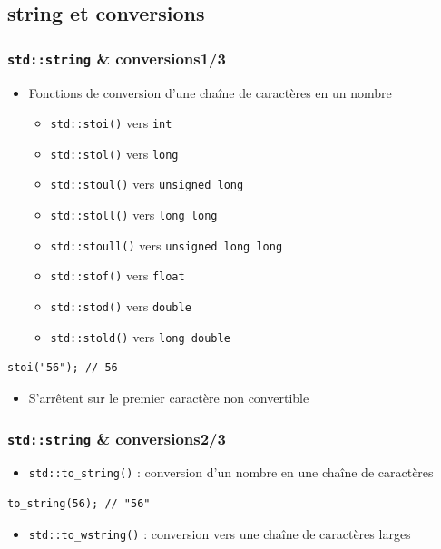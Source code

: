 \documentclass[C++.tex]{subfiles}
\begin{document}
\subsection*{string et conversions}
\begin{frame}[fragile]
	\frametitle{\lstinline|std::string| \& conversions\titlehfill{}1/3}
	\begin{itemize}
		\item Fonctions de conversion d'une chaîne de caractères en un nombre
		\begin{itemize}
			\item \lstinline|std::stoi()| vers \lstinline|int|
			\item \lstinline|std::stol()| vers \lstinline|long|
			\item \lstinline|std::stoul()| vers \lstinline|unsigned long|
			\item \lstinline|std::stoll()| vers \lstinline|long long|
			\item \lstinline|std::stoull()| vers \lstinline|unsigned long long|
			\item \lstinline|std::stof()| vers \lstinline|float|
			\item \lstinline|std::stod()| vers \lstinline|double|
			\item \lstinline|std::stold()| vers \lstinline|long double|
		\end{itemize}
	\end{itemize}

	\begin{lstlisting}
stoi("56"); // 56\end{lstlisting}

	\begin{itemize}
		\item S'arrêtent sur le premier caractère non convertible
	\end{itemize}
\end{frame}

\begin{frame}[fragile]
	\frametitle{\lstinline|std::string| \& conversions\titlehfill{}2/3}
	\begin{itemize}
		\item \lstinline|std::to_string()| : conversion d'un nombre en une chaîne de caractères
	\end{itemize}

	\begin{lstlisting}
to_string(56); // "56"\end{lstlisting}

	\begin{itemize}
		\item \lstinline|std::to_wstring()| : conversion vers une chaîne de caractères larges
	\end{itemize}
\end{frame}
\end{document}
